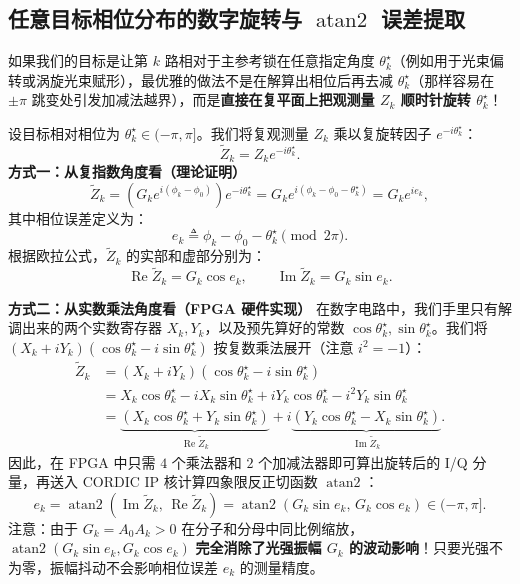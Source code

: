 \documentclass[UTF8, a4paper, 11pt]{ctexart}
\begin{document}
\subsection{任意目标相位分布的数字旋转与 \texorpdfstring{$\operatorname{atan2}$}{atan2} 误差提取}

如果我们的目标是让第 $k$ 路相对于主参考锁在任意指定角度 $\theta_k^\star$（例如用于光束偏转或涡旋光束赋形），最优雅的做法不是在解算出相位后再去减 $\theta_k^\star$（那样容易在 $\pm\pi$ 跳变处引发加减法越界），而是\textbf{直接在复平面上把观测量 $Z_k$ 顺时针旋转 $\theta_k^\star$}！

\begin{derivation}[复数旋转 $\widetilde{Z}_k = Z_k e^{-i\theta_k^\star}$ 的实部虚部展开与 FPGA 实现公式]
设目标相对相位为 $\theta_k^\star \in (-\pi, \pi]$。我们将复观测量 $Z_k$ 乘以复旋转因子 $e^{-i\theta_k^\star}$：
\[
    \widetilde{Z}_k = Z_k e^{-i\theta_k^\star}.
\]
\textbf{方式一：从复指数角度看（理论证明）}
\[
    \widetilde{Z}_k = \left(G_k e^{i(\phi_k - \phi_0)}\right) e^{-i\theta_k^\star} = G_k e^{i(\phi_k - \phi_0 - \theta_k^\star)} = G_k e^{i e_k},
\]
其中相位误差定义为：
\[
    e_k \triangleq \phi_k - \phi_0 - \theta_k^\star \pmod{2\pi}.
\]
根据欧拉公式，$\widetilde{Z}_k$ 的实部和虚部分别为：
\[
    \operatorname{Re}\widetilde{Z}_k = G_k \cos e_k, \qquad \operatorname{Im}\widetilde{Z}_k = G_k \sin e_k.
\]

\textbf{方式二：从实数乘法角度看（FPGA 硬件实现）}
在数字电路中，我们手里只有解调出来的两个实数寄存器 $X_k, Y_k$，以及预先算好的常数 $\cos\theta_k^\star, \sin\theta_k^\star$。我们将 $(X_k + iY_k)(\cos\theta_k^\star - i\sin\theta_k^\star)$ 按复数乘法展开（注意 $i^2 = -1$）：
\begin{align*}
    \widetilde{Z}_k &= (X_k + iY_k)(\cos\theta_k^\star - i\sin\theta_k^\star) \\
    &= X_k\cos\theta_k^\star - i X_k\sin\theta_k^\star + i Y_k\cos\theta_k^\star - i^2 Y_k\sin\theta_k^\star \\
    &= \underbrace{\left(X_k\cos\theta_k^\star + Y_k\sin\theta_k^\star\right)}_{\operatorname{Re}\widetilde{Z}_k} + i\underbrace{\left(Y_k\cos\theta_k^\star - X_k\sin\theta_k^\star\right)}_{\operatorname{Im}\widetilde{Z}_k}.
\end{align*}
因此，在 FPGA 中只需 $4$ 个乘法器和 $2$ 个加减法器即可算出旋转后的 I/Q 分量，再送入 CORDIC IP 核计算四象限反正切函数 $\operatorname{atan2}$：
\[
    \boxed{
    e_k = \operatorname{atan2}\left(\operatorname{Im}\widetilde{Z}_k, \, \operatorname{Re}\widetilde{Z}_k\right) = \operatorname{atan2}\left(G_k\sin e_k, \, G_k\cos e_k\right) \in (-\pi, \pi].
    }
\]
注意：由于 $G_k = A_0 A_k > 0$ 在分子和分母中同比例缩放，$\operatorname{atan2}(G_k\sin e_k, G_k\cos e_k)$ \textbf{完全消除了光强振幅 $G_k$ 的波动影响}！只要光强不为零，振幅抖动不会影响相位误差 $e_k$ 的测量精度。
\end{derivation}
\end{document}

